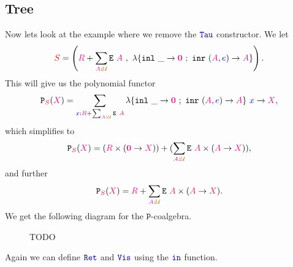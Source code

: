 \documentclass[twoside,11pt,openright]{report}
\newcommand*{\term}[1]{\textcolor{blue!80!black}{#1}}
\newcommand*{\type}[1]{\textcolor{magenta!90!black}{#1}}
\newcommand*{\container}[1]{\textcolor{red}{#1}}
\newcommand*{\universe}[1]{\textcolor{orange!80!black}{#1}}
\newcommand*{\empt}{\type{\textbf{0}}}
\newcommand*{\function}[1]{\textcolor{blue!60!black}{\ensuremath{\mathtt{#1}}}}
\newcommand*{\typeformer}[1]{\ensuremath{\mathtt{#1}}}
\newcommand*{\functor}[1]{\ensuremath{\mathbf{\mathtt{#1}}}}
\begin{document}
\subsection{Tree}
Now lets look at the example where we remove the \(\function{Tau}\) constructor. We let
\begin{equation}
\container{S} = \left(\type{R} + \sum_{\type{A} : \universe{\mathcal{U}}} \typeformer{E}~\type{A}~,~\lambda \{ \texttt{inl}~\_ \rightarrow \empt ~;~ \texttt{inr}~(\type{A},\term{e}) \rightarrow \type{A} \} \right).
\end{equation}
This will give us the polynomial functor
\begin{equation}
  \functor{P}_{\container{S}}(\type{X}) = \sum_{\term{x} : \type{R} + \sum_{\type{A} : \universe{\mathcal{U}}} \typeformer{E}~\type{A}} \lambda \{ \texttt{inl}~\_ \rightarrow \empt ~;~ \texttt{inr}~(\type{A},\term{e}) \rightarrow \type{A} \}~\term{x} \rightarrow \type{X},
\end{equation}
which simplifies to
\begin{equation}
  \functor{P}_{\container{S}}(\type{X}) = (\type{R} \times (\empt \rightarrow \type{X})) + (\sum_{\type{A} : \universe{\mathcal{U}}} \typeformer{E}~\type{A} \times (\type{A} \rightarrow \type{X})),
\end{equation}
and further
\begin{equation}
  \functor{P}_{\container{S}}(\type{X}) = \type{R} + \sum_{\type{A} : \universe{\mathcal{U}}} \typeformer{E}~\type{A} \times (\type{A} \rightarrow \type{X}).
\end{equation}
We get the following diagram for the \(\functor{P}\)-coalgebra.

\begin{figure}[h]
  \centering
  \caption{TODO}
\end{figure}
\noindent Again we can define \(\function{Ret}\) and \(\function{Vis}\) using the \(\function{in}\) function.
\end{document}
